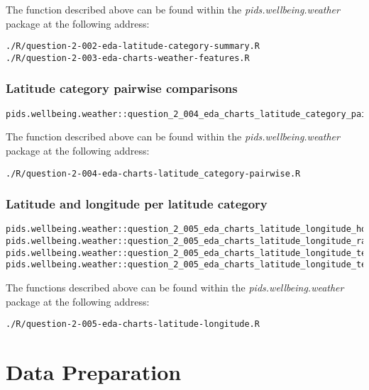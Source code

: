 \documentclass[12pt, oneside, openany]{book}
\begin{document}
The function described above can be found within the \emph{pids.wellbeing.weather} package at the following address:

\begin{verbatim}
./R/question-2-002-eda-latitude-category-summary.R
./R/question-2-003-eda-charts-weather-features.R
\end{verbatim}

\subsubsection*{Latitude category pairwise comparisons}

\begin{verbatim}
pids.wellbeing.weather::question_2_004_eda_charts_latitude_category_pairwise()
\end{verbatim}

The function described above can be found within the \emph{pids.wellbeing.weather} package at the following address:

\begin{verbatim}
./R/question-2-004-eda-charts-latitude_category-pairwise.R
\end{verbatim}

\subsubsection*{Latitude and longitude per latitude category}

\begin{verbatim}
pids.wellbeing.weather::question_2_005_eda_charts_latitude_longitude_hours_sun()
pids.wellbeing.weather::question_2_005_eda_charts_latitude_longitude_rain()
pids.wellbeing.weather::question_2_005_eda_charts_latitude_longitude_temp_max
pids.wellbeing.weather::question_2_005_eda_charts_latitude_longitude_temp_min
\end{verbatim}

The functions described above can be found within the \emph{pids.wellbeing.weather} package at the following address:

\begin{verbatim}
./R/question-2-005-eda-charts-latitude-longitude.R
\end{verbatim}

\section*{Data Preparation}
\end{document}
